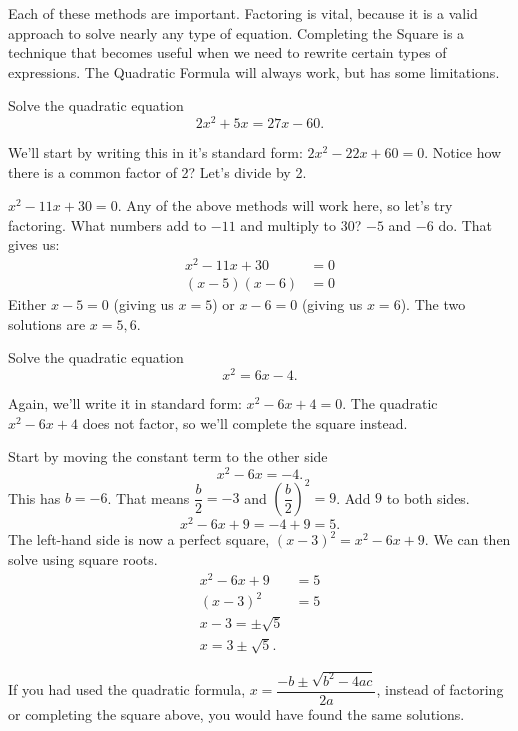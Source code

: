 \documentclass{ximera}
\begin{document}
Each of these methods are important.  Factoring is vital, because it is a valid approach to solve nearly any type of equation.  Completing
the Square is a technique that becomes useful when we need to rewrite certain types of expressions.  The Quadratic Formula will always
work, but has some limitations.

\begin{example}
	Solve the quadratic equation
	\[ 2x^2 +5x = 27 x - 60. \]
	\begin{explanation}
		We'll start by writing this in it's standard form: $2x^2 - 22x + 60 = 0$.  Notice how there is a common factor of 2? Let's divide by 2.
		
		$x^2 - 11x + 30 = 0$.  Any of the above methods will work here, so let's try factoring.  What numbers add to $-11$ and multiply to $30$?
		$-5$ and $-6$ do. That gives us:
		\begin{align*}
			x^2 - 11x + 30 &= 0\\
			(x-5)(x-6) &= 0
		\end{align*}
		Either $x-5 = 0$ (giving us $x=5$) or $x-6 = 0$ (giving us $x=6$).  The two solutions are $x = 5, 6$.
	\end{explanation}
\end{example}	

\begin{example}
	Solve the quadratic equation
	\[  x^2 = 6x -4.\]
	\begin{explanation}
		Again, we'll write it in standard form: $x^2 - 6x + 4 = 0$.  The quadratic $x^2 -6x+4$ does not factor, so we'll complete the square instead.
		
		Start by moving the constant term to the other side
		\[ x^2 - 6x = -4. \]
		This has $b = -6$.  That means $\displaystyle \dfrac{b}{2} = -3$ and $\displaystyle \left( \dfrac{b}{2}\right)^2 = 9$.  Add $9$ to both sides.
		\[ x^2 - 6x + 9 = -4 + 9 = 5. \]
		The left-hand side is now a perfect square, $\left(x-3\right)^2 = x^2 - 6x + 9$.  We can then solve using square roots.
		\begin{align*}
			x^2 - 6x + 9 &=  5\\
			\left( x-3 \right)^2 &= 5\\
			x-3 = \pm \sqrt{5} \\
			x = 3 \pm \sqrt{5}.
		\end{align*}
	\end{explanation}
\end{example}
If you had used the quadratic formula, $\displaystyle x = \dfrac{-b \pm \sqrt{b^2-4ac}}{2a}$, instead of factoring or completing the square above, you would have found the same solutions.
\end{document}
